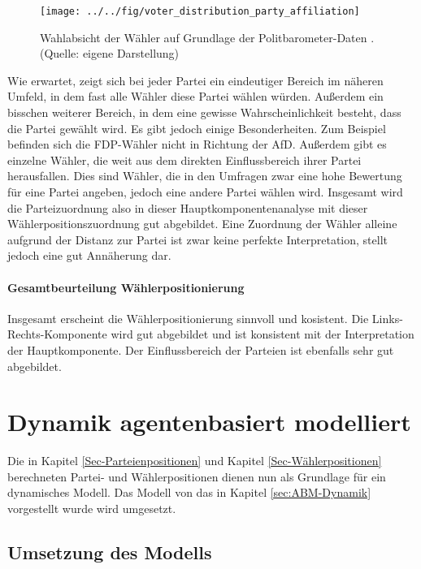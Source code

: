 \begin{figure}[htb]
	\centering
	\texttt{[image: ../../fig/voter\_distribution\_party\_affiliation]}
	\caption{Wahlabsicht der Wähler auf Grundlage der Politbarometer-Daten \citep{politbarometer}. (Quelle: eigene Darstellung)}
	\label{fig:voter-positions-pca-party-affiliation}
\end{figure}

Wie erwartet, zeigt sich bei jeder Partei ein eindeutiger Bereich im näheren Umfeld, in dem fast alle Wähler diese Partei wählen würden. Außerdem ein bisschen weiterer Bereich, in dem eine gewisse Wahrscheinlichkeit besteht, dass die Partei gewählt wird. Es gibt jedoch einige Besonderheiten. Zum Beispiel befinden sich die FDP-Wähler nicht in Richtung der AfD. Außerdem gibt es einzelne Wähler, die weit aus dem direkten Einflussbereich ihrer Partei herausfallen. Dies sind Wähler, die in den Umfragen zwar eine hohe Bewertung für eine Partei angeben, jedoch eine andere Partei wählen wird.
Insgesamt wird die Parteizuordnung also in dieser Hauptkomponentenanalyse mit dieser Wählerpositionszuordnung gut abgebildet. Eine Zuordnung der Wähler alleine aufgrund der Distanz zur Partei ist zwar keine perfekte Interpretation, stellt jedoch eine gut Annäherung dar.

\paragraph{Gesamtbeurteilung Wählerpositionierung}
Insgesamt erscheint die Wählerpositionierung sinnvoll und kosistent. Die Links-Rechts-Komponente wird gut abgebildet und ist konsistent mit der Interpretation der Hauptkomponente. Der Einflussbereich der Parteien ist ebenfalls sehr gut abgebildet.

\section{Dynamik agentenbasiert modelliert} \label{Sec:Dynamik-Anwendung}

Die in Kapitel \ref{Sec-Parteienpositionen} und Kapitel \ref{Sec-Wählerpositionen} berechneten Partei- und Wählerpositionen dienen nun als Grundlage für ein dynamisches Modell. Das Modell von \citet{laver2005policy} das in Kapitel \ref{sec:ABM-Dynamik} vorgestellt wurde wird umgesetzt.

\subsection{Umsetzung des Modells}

